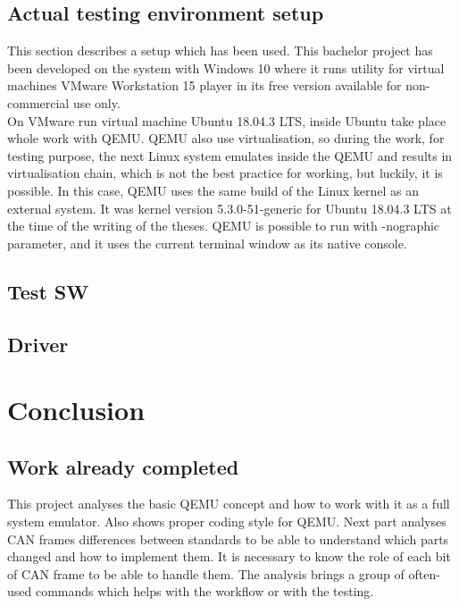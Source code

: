 \documentclass{ctuthesis}
\begin{document}
 \section{Actual testing environment setup}
  This section describes a setup which has been used. This bachelor project has been developed on the system with Windows 10 where it runs utility for virtual machines VMware  Workstation 15 player in its free version available for non-commercial use only. \cite{vmware} \\
  On VMware run virtual machine Ubuntu 18.04.3 LTS, \cite{ubuntu} inside Ubuntu take place whole work with QEMU. QEMU also use virtualisation, so during the work, for testing purpose, the next Linux system emulates inside the QEMU and results in virtualisation chain, which is not the best practice for working, but luckily, it is possible. In this case, QEMU uses the same build of the Linux kernel as an external system. It was kernel version 5.3.0-51-generic for Ubuntu 18.04.3 LTS at the time of the writing of the theses. QEMU is possible to run with -nographic parameter, and it uses the current terminal window as its native console. \\

 \section{Test SW}
 
 \section{Driver}
 
\chapter{Conclusion}

 \section{Work already completed}
  This project analyses the basic QEMU concept and how to work with it as a full system emulator. Also shows proper coding style for QEMU.  Next part analyses CAN frames differences between standards to be able to understand which parts changed and how to implement them. It is necessary to know the role of each bit of CAN frame to be able to handle them. The analysis brings a group of often-used commands which helps with the workflow or with the testing.
 
\end{document}
